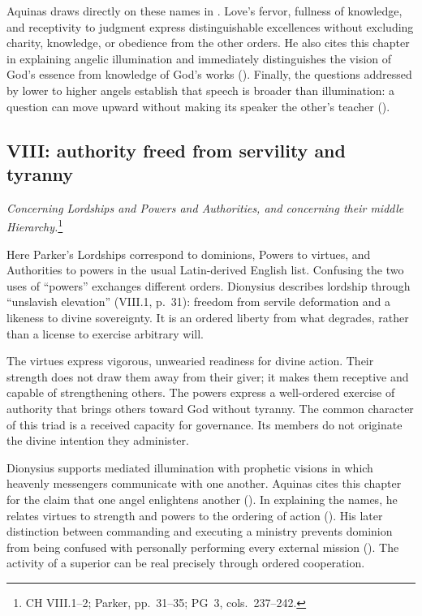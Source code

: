 Aquinas draws directly on these names in . Love's fervor, fullness of knowledge, and receptivity to judgment express distinguishable excellences without excluding charity, knowledge, or obedience from the other orders. He also cites this chapter in explaining angelic illumination and immediately distinguishes the vision of God's essence from knowledge of God's works (). Finally, the questions addressed by lower to higher angels establish that speech is broader than illumination: a question can move upward without making its speaker the other's teacher ().

\subsection{VIII: authority freed from servility and tyranny}
\emph{Concerning Lordships and Powers and Authorities, and concerning their middle Hierarchy.}\footnote{CH VIII.1--2; Parker, pp.~31--35; PG~3, cols.~237--242.}

Here Parker's Lordships correspond to dominions, Powers to virtues, and Authorities to powers in the usual Latin-derived English list. Confusing the two uses of ``powers'' exchanges different orders. Dionysius describes lordship through ``unslavish elevation'' (VIII.1, p.~31): freedom from servile deformation and a likeness to divine sovereignty. It is an ordered liberty from what degrades, rather than a license to exercise arbitrary will.

The virtues express vigorous, unwearied readiness for divine action. Their strength does not draw them away from their giver; it makes them receptive and capable of strengthening others. The powers express a well-ordered exercise of authority that brings others toward God without tyranny. The common character of this triad is a received capacity for governance. Its members do not originate the divine intention they administer.

Dionysius supports mediated illumination with prophetic visions in which heavenly messengers communicate with one another. Aquinas cites this chapter for the claim that one angel enlightens another (). In explaining the names, he relates virtues to strength and powers to the ordering of action (). His later distinction between commanding and executing a ministry prevents dominion from being confused with personally performing every external mission (). The activity of a superior can be real precisely through ordered cooperation.

